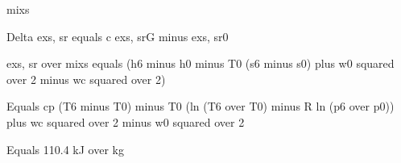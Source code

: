 mixs  

Delta exs, sr equals c exs, srG minus exs, sr0  

exs, sr over mixs equals (h6 minus h0 minus T0 (s6 minus s0) plus w0 squared over 2 minus wc squared over 2)  

Equals cp (T6 minus T0) minus T0 (ln (T6 over T0) minus R ln (p6 over p0)) plus wc squared over 2 minus w0 squared over 2  

Equals 110.4 kJ over kg